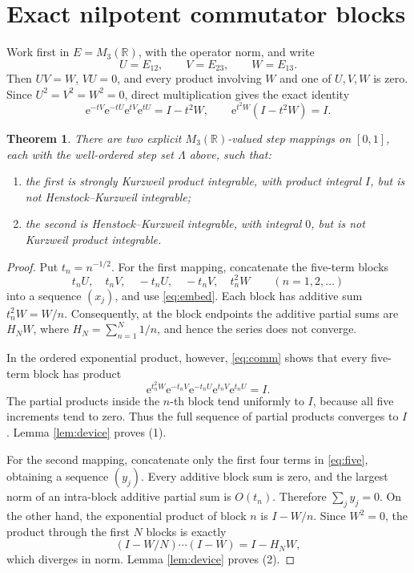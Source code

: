 \documentclass[10pt,a4paper]{article}
\newtheorem{theorem}{Theorem}
\newcommand{\R}{\mathbb R}
\newcommand{\e}{\mathrm e}
\newcommand{\Id}{I}
\begin{document}
\section{Exact nilpotent commutator blocks}

Work first in \(E=M_3(\R)\), with the operator norm, and write
\[
 U=E_{12},\qquad V=E_{23},\qquad W=E_{13}.
\]
Then \(UV=W\), \(VU=0\), and every product involving \(W\) and one of
\(U,V,W\) is zero.  Since \(U^2=V^2=W^2=0\), direct multiplication gives
the exact identity
\begin{equation}\label{eq:comm}
 \e^{-tV}\e^{-tU}\e^{tV}\e^{tU}=\Id-t^2W,
 \qquad
 \e^{t^2W}(\Id-t^2W)=\Id.
\end{equation}

\begin{theorem}\label{thm:main}
There are two explicit \(M_3(\R)\)-valued step mappings on \([0,1]\), each
with the well-ordered step set \(\Lambda\) above, such that:
\begin{enumerate}
\item the first is strongly Kurzweil product integrable, with product integral
\(\Id\), but is not Henstock--Kurzweil integrable;
\item the second is Henstock--Kurzweil integrable, with integral \(0\), but is
not Kurzweil product integrable.
\end{enumerate}
\end{theorem}

\begin{proof}
Put \(t_n=n^{-1/2}\).  For the first mapping, concatenate the five-term
blocks
\begin{equation}\label{eq:five}
 t_nU,\quad t_nV,\quad -t_nU,\quad -t_nV,\quad t_n^2W
 \qquad(n=1,2,\ldots)
\end{equation}
into a sequence \((x_j)\), and use \eqref{eq:embed}.  Each block has additive
sum \(t_n^2W=W/n\).  Consequently, at the block endpoints the additive
partial sums are \(H_NW\), where \(H_N=\sum_{n=1}^N1/n\), and hence the series
does not converge.

In the ordered exponential product, however, \eqref{eq:comm} shows that every
five-term block has product
\[
 \e^{t_n^2W}\e^{-t_nV}\e^{-t_nU}\e^{t_nV}\e^{t_nU}=\Id.
\]
The partial products inside the \(n\)-th block tend uniformly to \(\Id\),
because all five increments tend to zero.  Thus the full sequence of partial
products converges to \(\Id\).  Lemma \ref{lem:device} proves (1).

For the second mapping, concatenate only the first four terms in
\eqref{eq:five}, obtaining a sequence \((y_j)\).  Every additive block sum is
zero, and the largest norm of an intra-block additive partial sum is
\(O(t_n)\).  Therefore \(\sum_jy_j=0\).  On the other hand, the exponential
product of block \(n\) is \(\Id-W/n\).  Since \(W^2=0\), the product through
the first \(N\) blocks is exactly
\[
 (\Id-W/N)\cdots(\Id-W)=\Id-H_NW,
\]
which diverges in norm.  Lemma \ref{lem:device} proves (2).
\end{proof}
\end{document}
